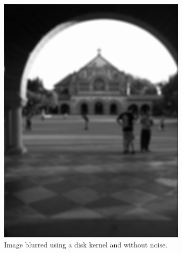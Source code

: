 \begin{figure}[H]
        \vspace{1cm}
        \begin{subfigure}[b]{0.35\textwidth}
                 \centering
                 \includegraphics[width=\textwidth]{memchu_blur.jpg}
                 \caption{Image blurred using a disk kernel and without noise.}\label{fig:base_images_nonoise}
        \end{subfigure}  
        \hspace{1.5cm}
        \begin{subfigure}[b]{0.35\textwidth}
                         \centering

\end{subfigure}
\end{figure}
